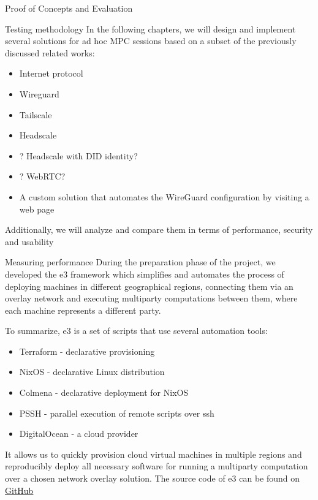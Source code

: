 \begin{frame}{Proof of Concepts and Evaluation}
\protect\hypertarget{proof-of-concepts-and-evaluation}{}
\begin{block}{Testing methodology}
\protect\hypertarget{testing-methodology}{}
In the following chapters, we will design and implement several
solutions for ad hoc MPC sessions based on a subset of the previously
discussed related works:

\begin{itemize}
\tightlist
\item
  Internet protocol
\item
  Wireguard
\item
  Tailscale
\item
  Headscale
\item
  ? Headscale with DID identity?
\item
  ? WebRTC?
\item
  A custom solution that automates the WireGuard configuration by
  visiting a web page
\end{itemize}

Additionally, we will analyze and compare them in terms of performance,
security and usability

\begin{block}{Measuring performance}
\protect\hypertarget{measuring-performance}{}
During the preparation phase of the project, we developed the \gls{e3}
framework which simplifies and automates the process of deploying
machines in different geographical regions, connecting them via an
overlay network and executing multiparty computations between them,
where each machine represents a different party.

To summarize, \gls{e3} is a set of scripts that use several automation
tools:

\begin{itemize}
\tightlist
\item
  Terraform - declarative provisioning
\item
  NixOS - declarative Linux distribution
\item
  Colmena - declarative deployment for NixOS
\item
  PSSH - parallel execution of remote scripts over ssh
\item
  DigitalOcean - a cloud provider
\end{itemize}

It allows us to quickly provision cloud virtual machines in multiple
regions and reproducibly deploy all necessary software for running a
multiparty computation over a chosen network overlay solution. The
source code of \gls{e3} can be found on
\href{https://github.com/e-nikolov/mpyc}{GitHub}


\end{block}
\end{block}
\end{frame}
